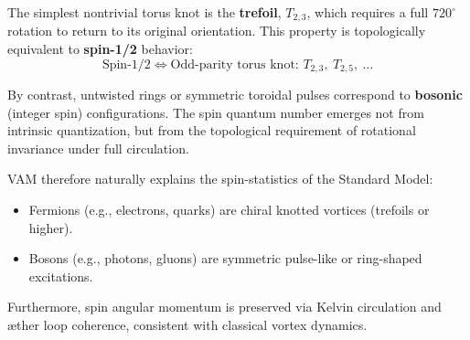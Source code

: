 The simplest nontrivial torus knot is the \textbf{trefoil}, \( T_{2,3} \), which requires a full \( 720^\circ \) rotation to return to its original orientation. This property is topologically equivalent to \textbf{spin-1/2} behavior:
\[
\text{Spin-1/2} \Longleftrightarrow \text{Odd-parity torus knot: } T_{2,3},\ T_{2,5},\ \ldots
\]

By contrast, untwisted rings or symmetric toroidal pulses correspond to \textbf{bosonic} (integer spin) configurations. The spin quantum number emerges not from intrinsic quantization, but from the topological requirement of rotational invariance under full circulation.

VAM therefore naturally explains the spin-statistics of the Standard Model:
\begin{itemize}
    \item Fermions (e.g., electrons, quarks) are chiral knotted vortices (trefoils or higher).
    \item Bosons (e.g., photons, gluons) are symmetric pulse-like or ring-shaped excitations.
\end{itemize}

Furthermore, spin angular momentum is preserved via Kelvin circulation and \ae ther loop coherence, consistent with classical vortex dynamics.
